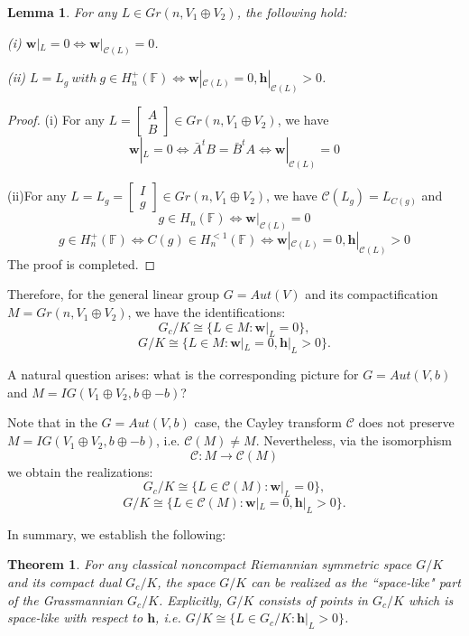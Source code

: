 \documentclass{article}
\newtheorem{thm}{Theorem}[section]
\newtheorem{lem}{Lemma}[section]
\begin{document}
\begin{lem}
For any $L \in Gr(n,  V_1\oplus V_2)$, the following hold:

(i) $\mathbf{w}|_L=0 \Leftrightarrow \mathbf{w}|_{\mathcal{C}(L)}=0$.

(ii) $L=L_g  ~ with ~ g \in H_n^{+}(\mathbb{F})  \Leftrightarrow \mathbf{w}|_{\mathcal{C}(L)}=0, \mathbf{h}|_{\mathcal{C}(L)}>0$.
\end{lem}

\begin{proof}
(i) For any $L=\left[
\begin{array}{cc}
A \\
B \end{array} \right] \in Gr(n,  V_1\oplus V_2)$, we have
\[
\mathbf{w}|_L=0 \Leftrightarrow \bar{A}^tB=\bar{B}^tA \Leftrightarrow \mathbf{w}|_{\mathcal{C}(L)}=0
\]

(ii)For any $L=L_g=\left[
\begin{array}{cc}
I \\
g \end{array} \right] \in Gr(n,  V_1\oplus V_2)$, we have $\mathcal{C}(L_g)=L_{C(g)}$ and
\[
g \in H_n(\mathbb{F}) \Leftrightarrow \mathbf{w}|_{\mathcal{C}(L)}=0
\]
\[
g \in H_n^{+}(\mathbb{F})  \Leftrightarrow C(g) \in H_n^{<1}(\mathbb{F}) \Leftrightarrow \mathbf{w}|_{\mathcal{C}(L)}=0, \mathbf{h}|_{\mathcal{C}(L)}>0
\]
The proof is completed.
\end{proof}

Therefore, for the general linear group $G=Aut(V)$ and its compactification $M=Gr(n,  V_1\oplus V_2)$, we have the identifications:
\[
G_c/K \cong  \{L \in M: \mathbf{w}|_L=0\},
\]
\[
G/K \cong  \{L \in M: \mathbf{w}|_L=0, \mathbf{h}|_L>0\}.
\]


A natural question arises: what is the corresponding picture for  $G=Aut(V,b)$ and  $M=IG(V_1 \oplus V_2, b\oplus-b)$?




Note that in the $G=Aut(V,b)$ case, the Cayley transform $ \mathcal{C}$ does not preserve $M=IG(V_1 \oplus V_2, b\oplus-b)$, i.e. $\mathcal{C}(M)\neq M$.
Nevertheless, via the isomorphism
\[
\mathcal{C}: M \rightarrow \mathcal{C}(M)
\]
we obtain the realizations:
\[
G_c/K \cong  \{L \in \mathcal{C}(M): \mathbf{w}|_L=0\},
\]
\[
G/K \cong  \{L \in \mathcal{C}(M): \mathbf{w}|_L=0, \mathbf{h}|_L>0\}.
\]

In summary, we establish the following:

\begin{thm}
For any classical noncompact Riemannian symmetric space $G/K$ and its compact dual $G_c/K$, the space $G/K$ can be realized as the ``space-like" part of the Grassmannian $G_c/K$.
Explicitly, $G/K$ consists of points in $G_c/K$ which is space-like with respect to $\mathbf{h}$, i.e. $G/K  \cong \{L \in G_c/K: \mathbf{h}|_L>0\}$.
\end{thm}
\end{document}
